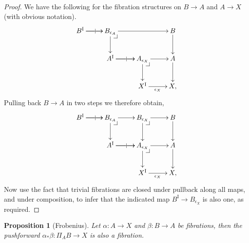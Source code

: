 \documentclass[11pt]{article}
\makeatletter
\newcommand{\pbcorner}[1][dr]{\save*!/#1-1.2pc/#1:(-1,1)@^{|-}\restore}
\newcommand{\ra}{\ensuremath{\rightarrow}}
\newcommand{\I}{\ensuremath{\mathrm{I}}}
\newtheorem{proposition}[theorem]{Proposition}
\theoremstyle{remark}
\theoremstyle{definition}
\makeatother
\begin{document}
\begin{proof}
We have the following for the fibration structures on $B\ra A$ and $A\ra X$ (with obvious notation).
\begin{equation}\label{diagram:fibcomposition1}
\xymatrix{
B^\I \ar[r]|| \ar[r]  & B_{\epsilon_A} \ar[rr]  \ar[d] \pbcorner & & B \ar[d]\\
&A^\I \ar[r]|| \ar[r] & A_{\epsilon_X} \ar[d] \pbcorner \ar[r] & A \ar[d]\\
&& X^\I \ar[r]_{\epsilon_X} &  X,
}
\end{equation}
Pulling back $B\ra A$ in two steps we therefore obtain,
\begin{equation}\label{diagram:fibcomposition2}
\xymatrix{
B^\I \ar[r]|| \ar[r]   & B_{\epsilon_A} \ar[r]  \ar[d] \pbcorner & B_{\epsilon_X}  \ar[d] \pbcorner \ar[r] & B \ar[d]\\
&A^\I \ar[r]|| \ar[r]  & A_{\epsilon_X} \ar[d] \pbcorner \ar[r] & A \ar[d]\\
&& X^\I \ar[r]_{\epsilon_X} &  X,
}
\end{equation}
Now use the fact that trivial fibrations are closed under pullback along all maps, and under composition, to infer that the indicated map $B^\I \to B_{\epsilon_X} $ is also one, as required.
\end{proof}

\begin{proposition}[Frobenius]
Let $\alpha : A \ra X$ and $\beta: B\ra A$  be fibrations, then the pushforward $\alpha_*\beta : \Pi_AB \ra X$ is also a fibration.
\end{proposition}
\end{document}
